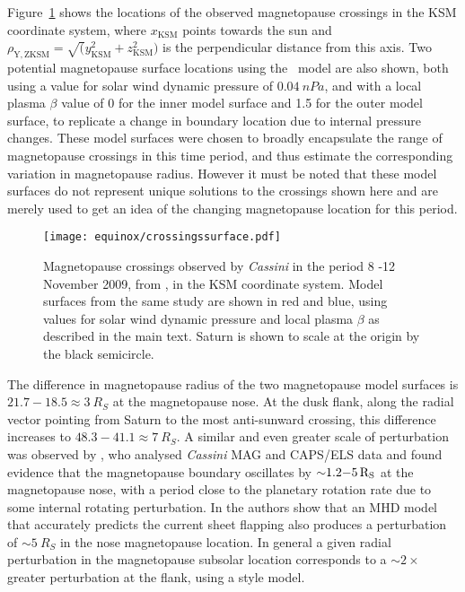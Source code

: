 Figure~\ref{equinox:fig:crossingssurface} shows the locations of the observed magnetopause crossings in the KSM coordinate system, where $x_\mathrm{KSM}$ points towards the sun and $\rho_\mathrm{Y,ZKSM} = \sqrt(y_\mathrm{KSM}^2 + z_\mathrm{KSM}^2)$ is the perpendicular distance from this axis. Two potential magnetopause surface locations using the~\citet{pilkington2015} model are also shown, both using a value for solar wind dynamic pressure of $\SI{0.04}{nPa}$, and with a local plasma $\beta$ value of 0 for the inner model surface and 1.5 for the outer model surface, to replicate a change in boundary location due to internal pressure changes. These model surfaces were chosen to broadly encapsulate the range of magnetopause crossings in this time period, and thus estimate the corresponding variation in magnetopause radius. However it must be noted that these model surfaces do not represent unique solutions to the crossings shown here and are merely used to get an idea of the changing magnetopause location for this period.
\begin{figure}
\centering
\texttt{[image: equinox/crossingssurface.pdf]}
\caption[Magnetopause crossings observed by \textit{Cassini}, and model magnetopause surfaces.]{Magnetopause crossings observed by \textit{Cassini} in the period 8 -12 November 2009, from \citet{pilkington2015}, in the KSM coordinate system. Model surfaces from the same study are shown in red and blue, using values for solar wind dynamic pressure and local plasma $\beta$ as described in the main text. Saturn is shown to scale at the origin by the black semicircle.}
\label{equinox:fig:crossingssurface}
\end{figure}

The difference in magnetopause radius of the two magnetopause model surfaces is $21.7-18.5 \approx\SI{3}{R_S}$ at the magnetopause nose. At the dusk flank, along the radial vector pointing from Saturn to the most anti-sunward crossing, this difference increases to $48.3-41.1\approx\SI{7}{R_S}$. A similar and even greater scale of perturbation was observed by \citet{clarke2010}, who analysed \textit{Cassini} MAG and CAPS/ELS data and found evidence that the magnetopause boundary oscillates by ${\sim}1.2{\--}\SI{5}{R_S}$ at the magnetopause nose, with a period close to the planetary rotation rate due to some internal rotating perturbation. In \citet{kivelson2014} the authors show that an MHD model that accurately predicts the current sheet flapping also produces a perturbation of ${\sim}\SI{5}{R_S}$ in the nose magnetopause location. In general a given radial perturbation in the magnetopause subsolar location corresponds to a ${\sim}2\times$ greater perturbation at the flank, using a \citet{pilkington2015} style model.


